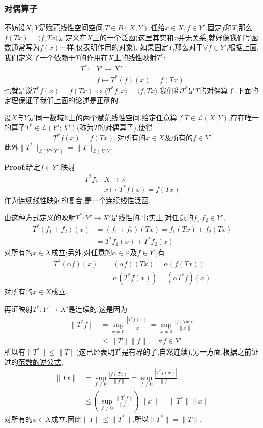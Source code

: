 \subsubsection{对偶算子}
不妨设$X,Y$是赋范线性空间空间,$T\in B(X,Y)$.任给$x\in X,f\in Y'$.固定$f$和$T$,那么$f(Tx)=\langle f,Tx\rangle$是定义在$X$上的一个泛函(这里其实和$x$并无关系,就好像我们写函数通常写为$f(x)$一样,仅表明作用的对象).
如果固定$T$,那么对于$\forall f\in Y'$,根据上面,我们定义了一个依赖于$T$的作用在$X$上的线性映射$T^*$:
$$
\begin{aligned}
    T^*:&Y'\to X'\\
          &f\mapsto T^*(f)(x)=f(Tx)
\end{aligned}
$$
也就是说$T^*f(x)=f(Tx)\Leftrightarrow \langle T^*f,x\rangle =\langle f,Tx\rangle$.我们称$T^*$是$T$的对偶算子.下面的定理保证了我们上面的论述是正确的.
\begin{tcolorbox}[colback=KuangNei,colframe=BianKuang,title=\textbf{对偶算子},sharpish corners]
设$X$与$Y$是同一数域$\mathbb{K}$上的两个赋范线性空间.给定任意算子$T\in\mathcal{L}(X;Y)$,存在唯一的算子$T^*\in\mathcal{L}(Y';X')$(称为$T$的对偶算子),使得
$$
T^*f(x)=f(Tx),\text{对所有的}x\in X\text{及所有的}f\in Y'
$$
此外$\|T^*\|_{\mathcal{L}(Y';X')}=\|T\|_{\mathcal{L}(X;Y)}$
\end{tcolorbox}
\textbf{Proof}:给定$f\in Y'$,映射
$$
\begin{aligned}
    T^*f:&X\to \mathbb{K}\\
          &x\mapsto T^*f(x)=f(Tx)
\end{aligned}
$$
作为连续线性映射的复合,是一个连续线性泛函.\par
由这种方式定义的映射$T^*:Y'\to X'$是线性的.事实上,对任意的$f_1.f_2\in Y'$,
$$
\begin{aligned}
    T^*(f_1+f_2)(x) &= (f_1+f_2)(Tx)=f_1(Tx)+f_2(Tx)\\
                    &= T^*f_1(x)+T^*f_2(x)
\end{aligned}
$$
对所有的$x\in X$成立;另外,对任意的$\alpha\in\mathbb{K}$及$f\in Y'$,有
$$
\begin{aligned}
    T^*(\alpha f)(x) &= (\alpha f)(Tx)=\alpha (f(Tx))\\
                     &= \alpha (T^*f(x))=(\alpha T^*f)(x)
\end{aligned}
$$
对所有的$x\in X$成立.\par
再证映射$T^*:Y'\to X'$是连续的.这是因为
$$
\begin{aligned}
    \|T^*f\| &=\sup_{x\neq 0}\frac{|T^*f(x)|}{\|x\|} =\sup_{x\neq 0}\frac{|f(Tx)|}{\|x\|}\\
             &\leqslant \|T\|\|f\|,\quad \forall f\in Y'
\end{aligned}
$$
所以有$\|T^*\|\leqslant \|T\|$(这已经表明$T^*$是有界的了,自然连续).另一方面,根据之前证过的\hyperlink{范数的逆公式}{范数的逆公式},
$$
\begin{aligned}
    \|Tx\| &=\sup_{f\neq 0}\frac{|f(Tx)|}{\|f\|}=\sup_{f\neq 0}\frac{|T^*f(x)|}{\|f\|}\\
           &\leqslant\left(\sup_{f\neq 0}\frac{\|T^*f\|}{\|f\|}\right)\|x\|=\|T^*\|\|x\|
\end{aligned}
$$
对所有的$x\in X$成立.因此$\|T\|\leqslant\|T^*\|$.所以$\|T^*\|=\|T\|$.\par


